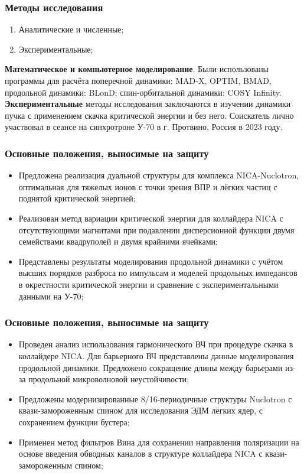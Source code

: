 \begin{frame}
	\frametitle{Методы исследования}
	\begin{enumerate}
		\item	Аналитические и численные;
		\item	Экспериментальные;
	\end{enumerate}
	\vspace{2em}
	\textbf{Математическое и компьютерное моделирование}. Были использованы программы для расчёта поперечной динамики: MAD-X, OPTIM, BMAD, продольной динамики: BLonD; спин-орбитальной динамики: COSY Infinity.\\
	\vspace{1em}
	\textbf{Экспериментальные} методы исследования заключаются в изучении динамики пучка с применением скачка критической энергии и без него.
	Соискатель лично участвовал в сеансе на синхротроне У-70 в г. Протвино, Россия в 2023 году.

\end{frame}
\begin{frame}
	\frametitle{Основные положения, выносимые на защиту}
	\begin{itemize}
		\item 	Предложена реализация дуальной структуры для комплекса NICA-Nuclotron, оптимальная для тяжелых ионов с точки зрения ВПР и лёгких частиц с поднятой критической энергией;
		\vspace{1em}
		\item	Реализован метод вариации критической энергии для коллайдера NICA с отсутствующими магнитами при подавлении дисперсионной функции двумя семействами квадруполей и двумя крайними ячейками;
		\vspace{1em}
		\item	Представлены результаты моделирования продольной динамики с учётом высших порядков разброса по импульсам и моделей продольных импедансов в окрестности критической энергии и сравнение с экспериментальными данными на У-70;
	\end{itemize}
\end{frame}
\begin{frame}
	\frametitle{Основные положения, выносимые на защиту}
	\begin{itemize}
		\item	Проведен анализ использования гармонического ВЧ при процедуре скачка в коллайдере NICA. Для барьерного ВЧ представлены данные моделирования продольной динамики. Предложено сокращение длины между барьерами из-за продольной микроволновой неустойчивости;
		\vspace{1em}
		\item	Предложены модернизированные 8/16-периодичные структуры Nuclotron с квази-замороженным спином для исследования ЭДМ лёгких ядер, с сохранением функции бустера;
		\vspace{1em}
		\item	Применен метод фильтров Вина для сохранении направления поляризации на основе введения обводных каналов в структуре коллайдера NICA с квази-замороженным спином;
	\end{itemize}
\end{frame}
